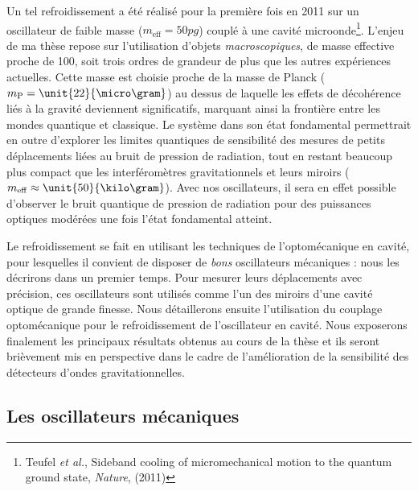 \documentclass[12pt,a4paper]{article}
\begin{document}
Un tel refroidissement a été réalisé pour la première fois en 2011 sur un oscillateur de faible masse ($m_\mathrm{eff} = \unit{50}{pg}$) couplé à une cavité microonde\footnote{Teufel \textit{et al.}, Sideband cooling of micromechanical motion to the quantum ground state, \textit{Nature}, (2011)}.
L'enjeu de ma thèse repose sur l'utilisation d'objets \emph{macroscopiques}, de masse effective proche de \unit{100}{\micro\gram}, soit trois ordres de grandeur de plus que les autres expériences actuelles.
Cette masse est choisie proche de la masse de Planck ($m_\mathrm{P}=\unit{22}{\micro\gram}$) au dessus de laquelle les effets de décohérence liés à la gravité deviennent significatifs, marquant ainsi la frontière entre les \og mondes \fg{} quantique et classique. 
Le système dans son état fondamental permettrait en outre d'explorer les limites quantiques de sensibilité des mesures de petits déplacements liées au bruit de pression de radiation, tout en restant beaucoup plus compact que les interféromètres gravitationnels et leurs miroirs ($m_\mathrm{eff}\approx\unit{50}{\kilo\gram}$).
Avec nos oscillateurs, il sera en effet possible d'observer le bruit quantique de pression de radiation pour des puissances optiques modérées une fois l'état fondamental atteint.

Le refroidissement se fait en utilisant les techniques de l'optomécanique en cavité, pour lesquelles il convient de disposer de \textit{bons} oscillateurs mécaniques : nous les décrirons dans un premier temps.
Pour mesurer leurs déplacements avec précision, ces oscillateurs sont utilisés comme l'un des miroirs d'une cavité optique de grande finesse.
Nous détaillerons ensuite l'utilisation du couplage optomécanique pour le refroidissement de l'oscillateur en cavité.
Nous exposerons finalement les principaux résultats obtenus au cours de la thèse et ils seront brièvement mis en perspective dans le cadre de l'amélioration de la sensibilité des détecteurs d'ondes gravitationnelles.

\subsection{Les oscillateurs mécaniques}
\label{sec:mechanical_oscillators}
\end{document}
